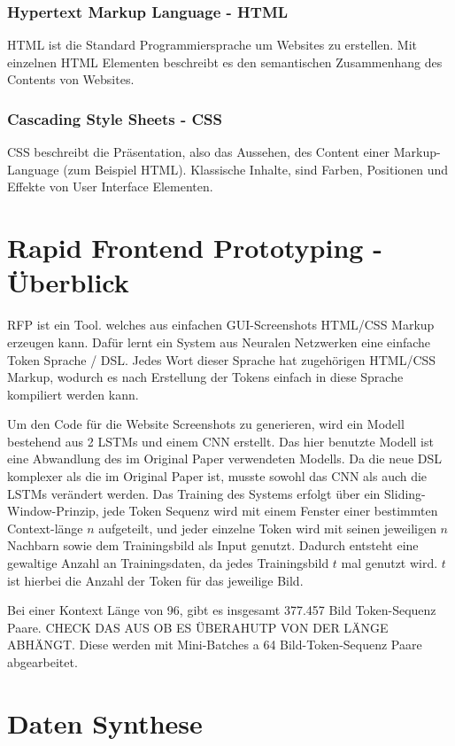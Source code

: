 \documentclass[pdftex,a4paper,halfparskip]{scrartcl}
\begin{document}
\subsubsection{Hypertext Markup Language - HTML}
HTML ist die Standard Programmiersprache um Websites zu erstellen. Mit einzelnen HTML Elementen beschreibt es den semantischen Zusammenhang des Contents von Websites.

\subsubsection{Cascading Style Sheets - CSS}
CSS beschreibt die Präsentation, also das Aussehen, des Content einer Markup-Language (zum Beispiel HTML). Klassische Inhalte, sind Farben, Positionen und Effekte von User Interface Elementen.
 

\section{Rapid Frontend Prototyping - Überblick}

RFP ist ein Tool. welches aus einfachen GUI-Screenshots HTML/CSS Markup erzeugen kann. Dafür lernt ein System aus Neuralen Netzwerken eine einfache Token Sprache / DSL. Jedes Wort dieser Sprache hat zugehörigen HTML/CSS Markup, wodurch es nach Erstellung der Tokens einfach in diese Sprache kompiliert werden kann.

Um den Code für die Website Screenshots zu generieren, wird ein Modell bestehend aus 2 LSTMs und einem CNN erstellt. Das hier benutzte Modell ist eine Abwandlung des im Original Paper verwendeten Modells. Da die neue DSL komplexer als die im Original Paper ist, musste sowohl das CNN als auch die LSTMs verändert werden. 
Das Training des Systems erfolgt über ein Sliding-Window-Prinzip, jede Token Sequenz wird mit einem Fenster einer bestimmten Context-länge $n$ aufgeteilt, und jeder einzelne Token wird mit seinen jeweiligen $n$ Nachbarn sowie dem Trainingsbild als Input genutzt. Dadurch entsteht eine gewaltige Anzahl an Trainingsdaten, da jedes Trainingsbild $t$ mal genutzt wird. $t$ ist hierbei die Anzahl der Token für das jeweilige Bild. 

Bei einer Kontext Länge von 96, gibt es insgesamt 377.457 Bild Token-Sequenz Paare. CHECK DAS AUS OB ES ÜBERAHUTP VON DER LÄNGE ABHÄNGT. Diese werden mit Mini-Batches a 64 Bild-Token-Sequenz Paare abgearbeitet. 


\section{Daten Synthese}
\end{document}
